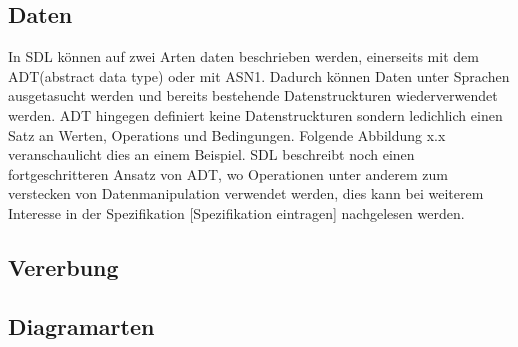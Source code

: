 \subsection{Daten}
\label{ssc:Daten}
In SDL können auf zwei Arten daten beschrieben werden, einerseits mit dem \ac{ADT}(abstract data type) oder mit \ac{ASN1}. Dadurch können Daten unter Sprachen ausgetasucht werden und bereits bestehende Datenstruckturen wiederverwendet werden. \ac{ADT} hingegen definiert keine Datenstruckturen sondern ledichlich einen Satz an Werten, Operations und Bedingungen. Folgende Abbildung x.x veranschaulicht dies an einem Beispiel. \ac{SDL} beschreibt noch einen fortgeschritteren Ansatz von \ac{ADT}, wo Operationen unter anderem zum verstecken von Datenmanipulation verwendet werden, dies kann bei weiterem Interesse in der Spezifikation [Spezifikation eintragen] nachgelesen werden.    
\subsection{Vererbung} 
\label{ssc:Vererbung}
\subsection{Diagramarten}
\label{ssc:Diagramarten}
